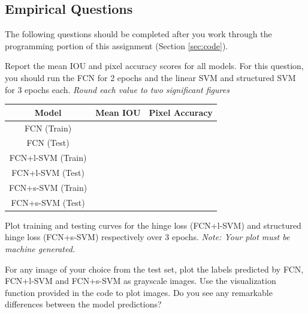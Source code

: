 \documentclass[11pt,addpoints,answers]{exam}
\numberwithin{equation}{section} %
\numberwithin{figure}{section} %
\numberwithin{table}{section} %
\begin{document}
\clearpage
\subsection{Empirical Questions}

The following questions should be completed after you work through the programming portion of this assignment (Section \ref{sec:code}). 

\begin{questions}
\question[12] Report the mean IOU and pixel accuracy scores for all models. For this question, you should run the FCN for 2 epochs and the linear SVM and structured SVM for 3 epochs each. \emph{Round each value to two significant figures}
\bgroup
\def\arraystretch{1.5}
\begin{center}
\begin{tabular}{ |c|p{2cm}|p{3cm}| } 
 \hline
 \textbf{Model} & \textbf{Mean IOU} &  \textbf{Pixel Accuracy} \\
 \hline
FCN (Train) &  & \\ \hline
FCN (Test) &  &  \\ \hline
FCN+l-SVM (Train) &  &  \\ \hline
FCN+l-SVM (Test) &  &  \\ \hline
FCN+s-SVM (Train) &  &  \\ \hline
FCN+s-SVM (Test) &  &  \\ \hline
\end{tabular}
\end{center}
\egroup

\question[10] Plot training and testing curves for the hinge loss (FCN+l-SVM) and structured hinge loss (FCN+s-SVM) respectively over 3 epochs. \emph{Note: Your plot must be machine generated.}
\begin{tcolorbox}[fit,height=12cm, width=15cm, blank, borderline={1pt}{-2pt}]
\end{tcolorbox}

\question[3] For any image of your choice from the test set, plot the labels predicted by FCN, FCN+l-SVM and FCN+s-SVM as grayscale images. Use the visualization function provided in the code to plot images. Do you see any remarkable differences between the model predictions?
\begin{tcolorbox}[fit,height=12cm, width=15cm, blank, borderline={1pt}{-2pt}]
\end{tcolorbox}

\end{questions}
\end{document}
